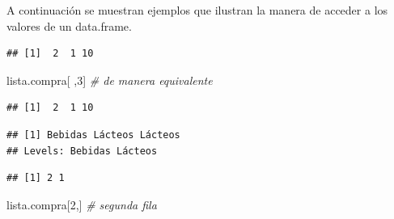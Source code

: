 \documentclass[]{book}
\newenvironment{Shaded}{\begin{snugshade}}{\end{snugshade}}
\newcommand{\CommentTok}[1]{\textcolor[rgb]{0.56,0.35,0.01}{\textit{#1}}}
\newcommand{\DecValTok}[1]{\textcolor[rgb]{0.00,0.00,0.81}{#1}}
\newcommand{\NormalTok}[1]{#1}
\newcommand{\OperatorTok}[1]{\textcolor[rgb]{0.81,0.36,0.00}{\textbf{#1}}}
\begin{document}
A continuación se muestran ejemplos que ilustran la manera de acceder
a los valores de un data.frame.

\begin{Shaded}
\end{Shaded}

\begin{verbatim}
## [1]  2  1 10
\end{verbatim}

\begin{Shaded}
\begin{Highlighting}[]
\NormalTok{lista.compra[ ,}\DecValTok{3}\NormalTok{]  }\CommentTok{# de manera equivalente}
\end{Highlighting}
\end{Shaded}

\begin{verbatim}
## [1]  2  1 10
\end{verbatim}

\begin{Shaded}
\end{Shaded}

\begin{verbatim}
## [1] Bebidas Lácteos Lácteos
## Levels: Bebidas Lácteos
\end{verbatim}

\begin{Shaded}
\end{Shaded}

\begin{verbatim}
## [1] 2 1
\end{verbatim}

\begin{Shaded}
\begin{Highlighting}[]
\NormalTok{lista.compra[}\DecValTok{2}\NormalTok{,]  }\CommentTok{# segunda fila}
\end{Highlighting}
\end{Shaded}
\end{document}
